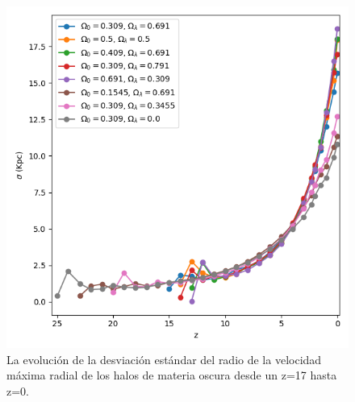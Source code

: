 \documentclass{beamer}
\begin{document}
\begin{frame}
\begin{columns}[t]
			\begin{column}{.5\textwidth}
				\begin{figure}
					\centering
					\includegraphics[scale=0.3]{Conc/VMaxRad_Std_Conc.png}
					\caption{\footnotesize La evolución de la desviación estándar del radio de la velocidad máxima radial de los halos de materia oscura desde un z=17 hasta z=0.}
					\label{fig:Conc-VMaxRadStd}
				\end{figure}
			\end{column}
		\end{columns}

	\end{frame}	

\end{document}
